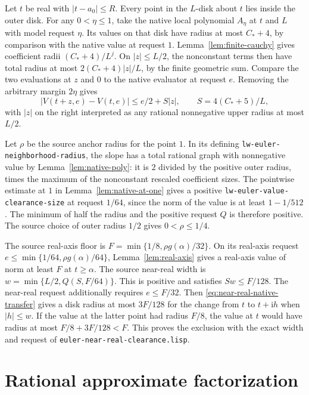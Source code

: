 \documentclass[11pt]{amsart}
\theoremstyle{definition}
\theoremstyle{remark}
\numberwithin{equation}{section}
\newcommand{\code}[1]{\nolinkurl{#1}}
\begin{document}
Let $t$ be real with $|t-a_0|\le R$. Every point in
the $L$-disk about $t$ lies inside the outer disk.
For any $0<\eta\le1$, take the native local polynomial
$A_\eta$ at $t$ and $L$ with model request $\eta$.
Its values on that disk have radius at most $C_*+4$,
by comparison with the native value at request $1$.
Lemma~\ref{lem:finite-cauchy} gives coefficient radii
$(C_*+4)/L^j$. On $|z|\le L/2$, the nonconstant terms
then have total radius at most $2(C_*+4)|z|/L$,
by the finite geometric sum. Compare the two evaluations
at $z$ and $0$ to the native evaluator at request $e$.
Removing the arbitrary margin $2\eta$ gives
\begin{equation}\label{eq:near-real-native-transfer}
 |V(t+z,e)-V(t,e)|\le e/2+S|z|,
 \qquad S=4(C_*+5)/L ,
\end{equation}
with $|z|$ on the right interpreted as any rational
nonnegative upper radius at most $L/2$.

Let $\rho$ be the source anchor radius for the point $1$.
In its defining \code{lw-euler-neighborhood-radius},
the slope has a total rational graph with nonnegative value
by Lemma~\ref{lem:native-poly}: it is $2$ divided by the
positive outer radius, times the maximum of the nonconstant
rescaled coefficient sizes. The pointwise estimate at $1$
in Lemma~\ref{lem:native-at-one} gives a positive
\code{lw-euler-value-clearance-size} at request $1/64$,
since the norm of the value is at least $1-1/512$.
The minimum of half the radius and the positive request
$Q$ is therefore positive. The source choice of outer
radius $1/2$ gives $0<\rho\le1/4$.

The source real-axis floor is $F=\min\{1/8,\rho g(\alpha)/32\}$.
On its real-axis request
$e\le\min\{1/64,\rho g(\alpha)/64\}$,
Lemma~\ref{lem:real-axis} gives a real-axis value of norm
at least $F$ at $t\ge\alpha$.
The source near-real width is $w=\min\{L/2,Q(S,F/64)\}$.
This is positive and satisfies $Sw\le F/128$.
The near-real request additionally requires $e\le F/32$.
Then \eqref{eq:near-real-native-transfer} gives a disk radius
at most $3F/128$ for the change from $t$ to $t+\mathrm i h$
when $|h|\le w$. If the value at the latter point had radius
$F/8$, the value at $t$ would have radius at most
$F/8+3F/128<F$. This proves the exclusion with the exact
width and request of \code{euler-near-real-clearance.lisp}.

\section{Rational approximate factorization}
\label{sec:native-factorization}
\end{document}
